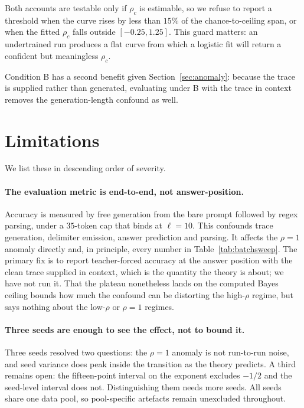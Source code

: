 \documentclass{article}
\theoremstyle{plain}
\theoremstyle{definition}
\theoremstyle{remark}
\newcommand{\1}{\mathbf{1}}
\begin{document}
Both accounts are testable only if $\rho_c$ is estimable, so we refuse to report
a threshold when the curve rises by less than $15\%$ of the chance-to-ceiling
span, or when the fitted $\rho_c$ falls outside $[-0.25,1.25]$. This guard
matters: an undertrained run produces a flat curve from which a logistic fit will
return a confident but meaningless $\rho_c$.

Condition B has a second benefit given Section~\ref{sec:anomaly}: because the
trace is supplied rather than generated, evaluating under B with the trace in
context removes the generation-length confound as well.

\section{Limitations}
\label{sec:limitations}

We list these in descending order of severity.

\paragraph{The evaluation metric is end-to-end, not answer-position.}
Accuracy is measured by free generation from the bare prompt followed by regex
parsing, under a $35$-token cap that binds at $\ell = 10$. This confounds trace
generation, delimiter emission, answer prediction and parsing. It affects the
$\rho = 1$ anomaly directly and, in principle, every number in
Table~\ref{tab:batchsweep}. The primary fix is to report teacher-forced accuracy
at the answer position with the clean trace supplied in context, which is the
quantity the theory is about; we have not run it. That the plateau nonetheless
lands on the computed Bayes ceiling bounds how much the confound can be
distorting the high-$\rho$ regime, but says nothing about the low-$\rho$ or
$\rho = 1$ regimes.

\paragraph{Three seeds are enough to see the effect, not to bound it.}
Three seeds resolved two questions: the $\rho = 1$ anomaly is not run-to-run
noise, and seed variance does peak inside the transition as the theory predicts.
A third remains open: the fifteen-point interval on the exponent excludes $-1/2$
and the seed-level interval does not. Distinguishing them needs more seeds. All
seeds share one data pool, so pool-specific artefacts remain unexcluded
throughout.
\end{document}
